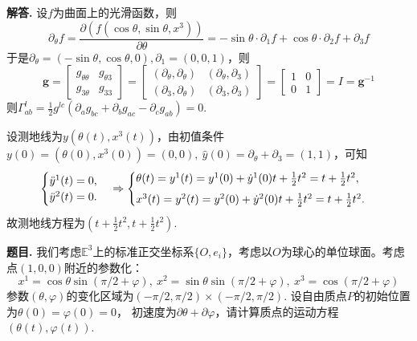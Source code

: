 \documentclass[12pt, a4paper, oneside]{ctexart}
\newcounter{problem}  %
\newenvironment{problem}[1][]{\stepcounter{problem}\par\noindent\textbf{题目\arabic{problem}. #1}}{\smallskip\par}
\newenvironment{solution}[1][]{\par\noindent\textbf{#1解答. }}{\smallskip\par}  %
\def\bd{\boldsymbol}        %
\def\E{\mathbb{E}}          %
\def\add{\vspace{1ex}}      %
\begin{document}
\begin{solution}
    设$f$为曲面上的光滑函数，则
    \begin{equation*}
        \partial_\theta f = \frac{\partial(f(\cos\theta,\sin\theta,x^3))}{\partial\theta} = -\sin\theta\cdot\partial_1f+\cos\theta\cdot\partial_2f+\partial_3f
    \end{equation*}
    于是$\partial_\theta = (-\sin\theta,\cos\theta,0),\partial_1 = (0,0,1)$，则
    \begin{equation*}
        \bd{g} = \begin{bmatrix}
            g_{\theta\theta}&g_{\theta 3}\\
            g_{3\theta}&g_{33}
        \end{bmatrix} = \begin{bmatrix}
            (\partial_\theta,\partial_\theta)&(\partial_\theta,\partial_3)\\
            (\partial_3,\partial_\theta)&(\partial_3,\partial_3)
        \end{bmatrix} = \begin{bmatrix}
            1&0\\ 0 &1
        \end{bmatrix}=I= \bd{g}^{-1}
    \end{equation*}
    则$\Gamma_{ab}^l = \frac{1}{2}g^{lc}(\partial_ag_{bc}+\partial_bg_{ac}-\partial_cg_{ab}) = 0$.\add

    设测地线为$y(\theta(t),x^3(t))$，由初值条件$y(0) = (\theta(0),x^3(0)) = (0,0),\ \hat{y}(0) = \partial_\theta + \partial_3 = (1,1)$，可知
    \begin{equation*}
        \begin{cases}
            \ddot{y}^1(t) = 0,\\
            \ddot{y}^2(t) = 0.
        \end{cases}\Rightarrow\begin{cases}
            \theta(t) = y^1(t) = y^1(0) + \dot{y}^1(0)t + \frac{1}{2}t^2 = t + \frac{1}{2}t^2,\add\\
            x^3(t) = y^2(t) = y^2(0) + \dot{y}^2(0)t + \frac{1}{2}t^2 = t + \frac{1}{2}t^2.
        \end{cases}
    \end{equation*}
    故测地线方程为$\left(t+\frac{1}{2}t^2, t+\frac{1}{2}t^2\right)$.
\end{solution}
\begin{problem}
    我们考虑$\E^3$上的标准正交坐标系$\{O,e_i\}$，考虑以$O$为球心的单位球面。考虑点$(1,0,0)$附近的参数化：
    \begin{equation*}
        x^1 = \cos\theta\sin(\pi/2+\varphi),\ x^2 = \sin\theta\sin(\pi/2+\varphi),\ x^3=\cos(\pi/2+\varphi)
    \end{equation*}
    参数$(\theta,\varphi)$的变化区域为$(-\pi/2,\pi/2)\times(-\pi/2,\pi/2)$. 设自由质点$P$的初始位置为$\theta(0) = \varphi(0) = 0$，
    初速度为$\partial\theta+\partial\varphi$，请计算质点的运动方程$(\theta(t),\varphi(t))$.
\end{problem}
\end{document}
